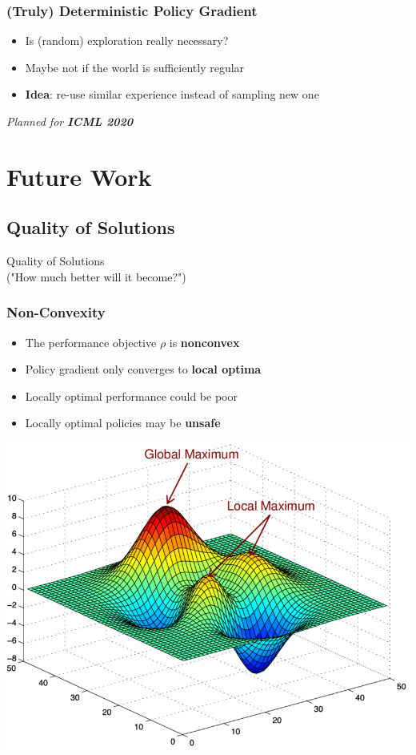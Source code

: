 \documentclass[aspectratio=169]{beamer}
\begin{document}
\begin{frame}
\frametitle{(Truly) Deterministic Policy Gradient}
\begin{itemize}
	\setlength{\itemsep}{10pt}
	\item Is (random) exploration really necessary?
	\item Maybe not if the world is sufficiently regular
	\item \textbf{Idea}: re-use similar experience instead of sampling new one
\end{itemize}

\vfill
\emph{Planned for \textbf{ICML 2020}}
\end{frame}

\section{Future Work}
\addtocounter{framenumber}{-1}
\frame{\tableofcontents[currentsection]}
\subsection{Quality of Solutions}

\addtocounter{framenumber}{-1}
\begin{frame}[plain]
\begin{center}
	\Large
	Quality of Solutions \\("How much better will it become?")
\end{center}
\end{frame}

\begin{frame}
\frametitle{Non-Convexity}
\begin{itemize}
	\setlength{\itemsep}{5pt}
	\item<1-> The performance objective $\rho$ is \textbf{nonconvex}
	\item<2-> Policy gradient only converges to \textbf{local optima}
	\item<3> Locally optimal performance could be poor
	\item<4> Locally optimal policies may be \textbf{unsafe}
\end{itemize}
\vspace{.25cm}
\centering
\includegraphics[width=.4\textwidth]{pics/nonconvex.png}
\end{frame}
\end{document}
